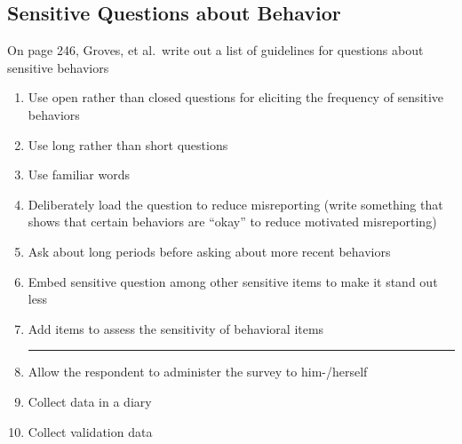 \documentclass[11pt]{lecturenotes}
\begin{document}
\subsection[10]{Sensitive Questions about Behavior}
On page 246, Groves, et al.\ write out a list of guidelines for questions about sensitive behaviors

\begin{enumerate}[noitemsep]
\item Use open rather than closed questions for eliciting the frequency of sensitive behaviors
\item Use long rather than short questions
\item Use familiar words
\item Deliberately load the question to reduce misreporting (write something that shows that certain behaviors are ``okay'' to reduce motivated misreporting)
\item Ask about long periods before asking about more recent behaviors
\item Embed sensitive question among other sensitive items to make it stand out less
\item Add items to assess the sensitivity of behavioral items
\hrule\vspace{.3em}
\item Allow the respondent to administer the survey to him-\slash herself 
\item Collect data in a diary
\item Collect validation data 
\end{enumerate}
\end{document}

